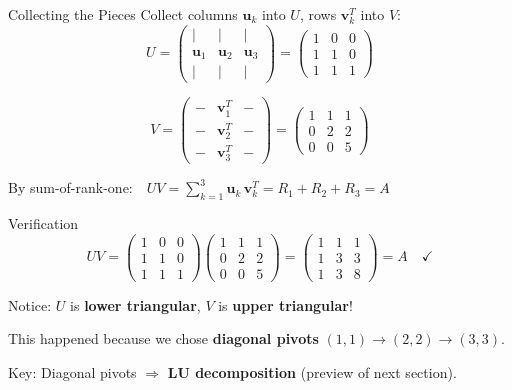 \documentclass[10pt]{beamer}
\theoremstyle{definition}
\newcommand{\x}[1]{\alert{\textbf{#1}}}
\begin{document}
\begin{frame}{Collecting the Pieces}
Collect columns $\mathbf{u}_k$ into $U$, rows $\mathbf{v}_k^T$ into $V$:
$$U = \begin{pmatrix}
| & | & | \\
\mathbf{u}_1 & \mathbf{u}_2 & \mathbf{u}_3 \\
| & | & |
\end{pmatrix}
= \begin{pmatrix}
1 & 0 & 0 \\
1 & 1 & 0 \\
1 & 1 & 1
\end{pmatrix}$$

$$V = \begin{pmatrix}
- & \mathbf{v}_1^T & - \\
- & \mathbf{v}_2^T & - \\
- & \mathbf{v}_3^T & -
\end{pmatrix}
= \begin{pmatrix}
1 & 1 & 1 \\
0 & 2 & 2 \\
0 & 0 & 5
\end{pmatrix}$$

By sum-of-rank-one:\ \ $UV = \sum_{k=1}^{3} \mathbf{u}_k\, \mathbf{v}_k^T = R_1 + R_2 + R_3 = A$
\end{frame}

\begin{frame}{Verification}
$$UV = \begin{pmatrix}
1 & 0 & 0 \\
1 & 1 & 0 \\
1 & 1 & 1
\end{pmatrix}
\begin{pmatrix}
1 & 1 & 1 \\
0 & 2 & 2 \\
0 & 0 & 5
\end{pmatrix}
= \begin{pmatrix}
1 & 1 & 1 \\
1 & 3 & 3 \\
1 & 3 & 8
\end{pmatrix} = A \quad \checkmark$$

\vfill
Notice: $U$ is \x{lower triangular}, $V$ is \x{upper triangular}!

\vfill
This happened because we chose \x{diagonal pivots} $(1,1) \to (2,2) \to (3,3)$.

\vfill
Key: Diagonal pivots $\Longrightarrow$ \x{LU decomposition} (preview of next section).
\end{frame}
\end{document}
